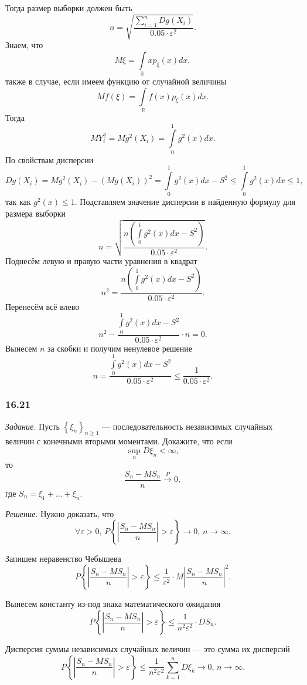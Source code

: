 Тогда размер выборки должен быть
$$n =
  \sqrt{ \frac{ \sum \limits_{i = 1}^n Dg \left( X_i \right) }{0.05 \cdot \varepsilon^2}}.$$
Знаем, что
$$M \xi =
  \int \limits_{ \mathbb{R}} x p_{ \xi } \left( x \right) dx,$$
также в случае, если имеем функцию от случайной величины
$$Mf \left( \xi \right) =
  \int \limits_{ \mathbb{R}} f \left( x \right) p_{ \xi } \left( x \right) dx.$$
Тогда
$$MY_i^2 =
  Mg^2 \left( X_i \right) =
  \int \limits_0^1 g^2 \left( x \right) dx.$$
По свойствам дисперсии
$$Dg \left( X_i \right) =
  Mg^2 \left( X_i \right) - \left( Mg \left( X_i \right) \right)^2 =
  \int \limits_0^1 g^2 \left( x \right) dx - S^2 \leq
  \int \limits_0^1 g^2 \left( x \right) dx \leq 1,$$
так как $g^2 \left( x \right) \leq 1$.
Подставляем значение дисперсии в найденную формулу для размера выборки
$$n =
  \sqrt{
    \frac{n \left( \int \limits_0^1 g^2 \left( x \right) dx - S^2 \right) }{0.05 \cdot \varepsilon^2}
  }.$$
Поднесём левую и правую части уравнения в квадрат
$$n^2 =
  \frac{n \left(
      \int \limits_0^1 g^2 \left( x \right) dx - S^2
    \right) }{0.05 \cdot \varepsilon^2}.$$
Перенесём всё влево
$$n^2 - \frac{\int \limits_0^1 g^2 \left( x \right) dx - S^2}{0.05 \cdot \varepsilon^2} \cdot n =
  0.$$
Вынесем $n$ за скобки и получим ненулевое решение
$$n =
  \frac{\int \limits_0^1 g^2 \left( x \right) dx - S^2}{0.05 \cdot \varepsilon^2} \leq
  \frac{1}{0.05 \cdot \varepsilon^2}.$$

\subsubsection*{16.21}

\textit{Задание.}
Пусть $ \left\{ \xi_n \right\}_{n \geq 1}$ ---
последовательность независимых случайных величин с конечными вторыми моментами.
Докажите, что если
$$ \sup \limits_n D \xi_n <
  \infty,$$
то
$$ \frac{S_n - MS_n}{n} \overset{P}{ \rightarrow } 0,$$
где $S_n = \xi_1 + \dotsc + \xi_n$.

\textit{Решение.} Нужно доказать, что
$$ \forall \varepsilon > 0, \,
  P \left\{ \left| \frac{S_n - MS_n}{n} \right| > \varepsilon \right\} \to 0, \,
  n \to \infty.$$

Запишем неравенство Чебышева
$$P \left\{ \left| \frac{S_n - MS_n}{n} \right| > \varepsilon \right\} \leq
  \frac{1}{ \varepsilon^2} \cdot M \left| \frac{S_n - MS_n}{n} \right|^2.$$

Вынесем константу из-под знака математического ожидания
$$P \left\{ \left| \frac{S_n - MS_n}{n} \right| > \varepsilon \right\} \leq
  \frac{1}{n^2 \varepsilon^2} \cdot DS_n.$$

Дисперсия суммы независимых случайных величин --- это сумма их дисперсий
$$P \left\{ \left| \frac{S_n - MS_n}{n} \right| > \varepsilon \right\} \leq
  \frac{1}{n^2 \varepsilon^2} \sum \limits_{k = 1}^n D \xi_k \to
  0, \,
  n \to \infty.$$
